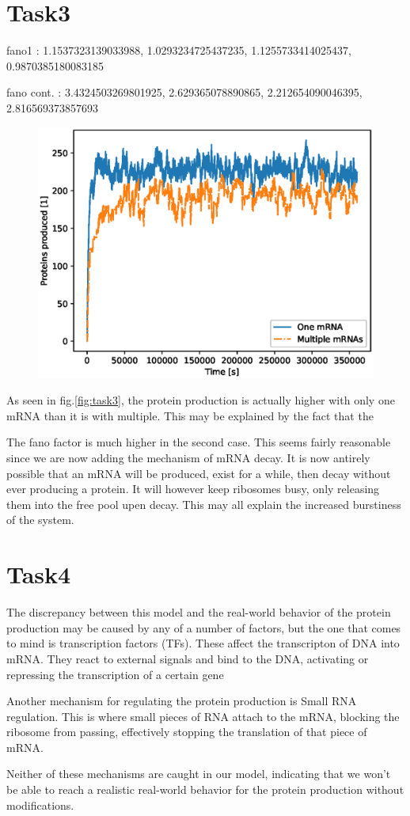 \documentclass{article}
\begin{document}
\section{Task3}
fano1 : 1.1537323139033988,  1.0293234725437235, 1.1255733414025437,  0.9870385180083185


fano cont. : 3.4324503269801925, 2.629365078890865, 2.212654090046395, 2.816569373857693

\begin{figure}[H]
	\includegraphics[width=\linewidth]{figs/task3_prot_prod_both_graphs_v1.eps}
	\label{fig:task3}
\end{figure}

As seen in fig.\eqref{fig:task3}, the protein production is actually higher with only one mRNA than it is with multiple. This may be explained by the fact that the 

The fano factor is much higher in the second case. This seems fairly reasonable since we are now adding the mechanism of mRNA decay. It is now antirely possible that an mRNA will be produced, exist for a while, then decay without ever producing a protein. It will however keep ribosomes busy, only releasing them into the free pool upen decay. This may all explain the increased burstiness of the system. 





\section{Task4}
The discrepancy between this model and the real-world behavior of the protein production may be caused by any of a number of factors, but the one that comes to mind is transcription factors (TFs). These affect the transcripton of DNA into mRNA. They react to external signals and bind to the DNA, activating or repressing the transcription of a certain gene

Another mechanism for regulating the protein production is Small RNA regulation. This is where small pieces of RNA attach to the mRNA, blocking the ribosome from passing, effectively stopping the translation of that piece of mRNA. 

Neither of these mechanisms are caught in our model, indicating that we won't be able to reach a realistic real-world behavior for the protein production without modifications. 
\end{document}
